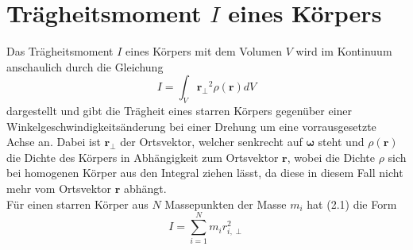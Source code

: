 
   
\section{Trägheitsmoment $I$ eines Körpers}
\label{sec: Traegheitsmoment}

Das Trägheitsmoment $I$ eines Körpers mit dem Volumen $V$ wird im Kontinuum anschaulich durch die Gleichung
\begin{equation}
    I = \int_V \mathbf{r_\perp}^2 \rho(\mathbf{r}) dV
\end{equation}
dargestellt und gibt die Trägheit eines starren Körpers gegenüber
einer Winkelgeschwindigkeitsänderung bei einer Drehung um eine vorrausgesetzte Achse an. 
Dabei ist $\mathbf{r_\perp}$ der Ortsvektor, welcher senkrecht auf $\mathbf{\omega}$ steht und 
$\rho(\mathbf{r})$ die Dichte des Körpers in Abhängigkeit zum Ortsvektor $\mathbf{r}$, wobei die Dichte $\rho$ sich
bei homogenen Körper aus den Integral ziehen lässt, da diese in diesem Fall nicht mehr vom Ortsvektor $\mathbf{r}$ abhängt.\\
Für einen starren Körper aus $N$ Massepunkten der Masse $m_i$ hat (2.1) die Form
\begin{equation}
    I = \sum_{i=1}^{N} m_i r_{i,\perp}^2
\end{equation}

